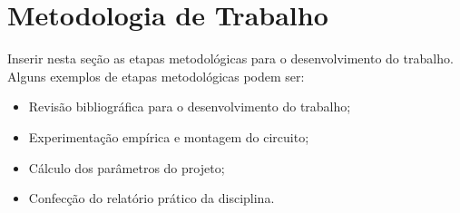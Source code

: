 \section{Metodologia de Trabalho}

Inserir nesta seção as etapas metodológicas para o desenvolvimento do trabalho. Alguns exemplos de etapas metodológicas podem ser:

\begin{itemize}
    \item Revisão bibliográfica para o desenvolvimento do trabalho;
    \item Experimentação empírica e montagem do circuito;
    \item Cálculo dos parâmetros do projeto;
    \item Confecção do relatório prático da disciplina.
\end{itemize}